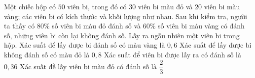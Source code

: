 \begin{ex}%
	Một chiếc hộp có $50$  viên bi, trong đó có $30$ viên bi màu đỏ và $20$ viên bi màu vàng; các viên bi có kích thước và khối lượng như nhau. Sau khi kiểm tra, người ta thấy có $80\%$ số viên bi màu đỏ đánh số và $60\%$ số viên bi màu vàng có đánh số, những viên bi còn lại không đánh số. Lấy ra ngẫu nhiên một viên bi trong hộp.
	\choiceTF 
		{\True Xác suất để lấy được bi đánh số có màu  vàng là $0{,}6$}
		{Xác suất để  lấy được bi không đánh số có màu đỏ là $0{,}8$}
		{Xác suất để viên bi  được lấy ra có đánh số là $0{,}36$}
		{\True Xác suất  đề lấy viên bi màu đỏ có đánh số là $\dfrac{2}{3}$}
\end{ex}

